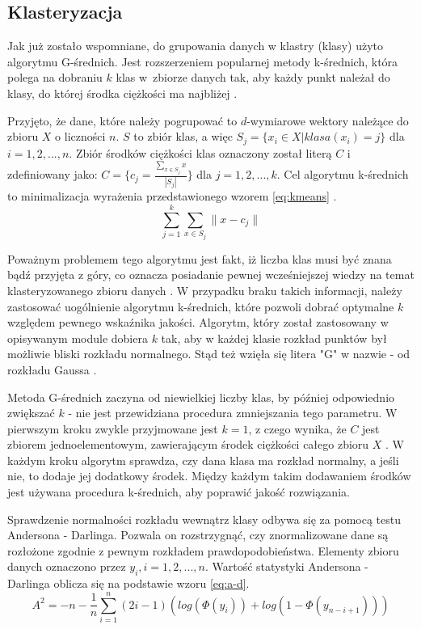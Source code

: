 \subsection{Klasteryzacja}
\quad Jak już zostało wspomniane, do grupowania danych w klastry (klasy) użyto algorytmu G-średnich. Jest rozszerzeniem popularnej metody k-średnich, która polega na dobraniu $k$ klas w~zbiorze danych tak, aby każdy punkt należał do klasy, do której środka ciężkości ma najbliżej \cite{KMeans}.

Przyjęto, że dane, które należy pogrupować to $d$-wymiarowe wektory należące do zbioru $X$ o liczności $n$. $S$ to zbiór klas, a więc $S_{j} = \{x_{i} \in X | klasa(x_{i}) = j\}$ dla $i = 1, 2, ..., n$. Zbiór środków ciężkości klas oznaczony został literą $C$ i zdefiniowany jako: $C = \{c_{j} = \frac{\sum_{x \in S_{j}} x}{|S_{j}|}\}$ dla $j = 1, 2, ..., k$.
Cel algorytmu k-średnich to minimalizacja wyrażenia przedstawionego wzorem \ref{eq:kmeans} .
\begin{equation}
\label{eq:kmeans}
\sum_{j=1}^{k}\sum_{x \in S_{j}} \|x - c_{j}\|
\end{equation}

Poważnym problemem tego algorytmu jest fakt, iż liczba klas musi być znana bądź przyjęta z góry, co oznacza posiadanie pewnej wcześniejszej wiedzy na temat klasteryzowanego zbioru danych \cite{GMeans, GMeansExplanation}. W przypadku braku takich informacji, należy zastosować uogólnienie algorytmu k-średnich, które pozwoli dobrać optymalne $k$ względem pewnego wskaźnika jakości.
Algorytm, który został zastosowany w opisywanym module dobiera $k$ tak, aby w każdej klasie rozkład punktów był możliwie bliski rozkładu normalnego. Stąd też wzięła się litera "G" w nazwie - od rozkładu Gaussa \cite{GMeans}.

Metoda G-średnich zaczyna od niewielkiej liczby klas, by później odpowiednio zwiększać $k$ - nie jest przewidziana procedura zmniejszania tego parametru. W pierwszym kroku zwykle przyjmowane jest $k = 1$, z czego wynika, że $C$ jest zbiorem jednoelementowym, zawierającym środek ciężkości całego zbioru $X$ \cite{GMeans}. W każdym kroku algorytm sprawdza, czy dana klasa ma rozkład normalny, a jeśli nie, to dodaje jej dodatkowy środek. Między każdym takim dodawaniem środków jest używana procedura k-średnich, aby poprawić jakość rozwiązania.

Sprawdzenie normalności rozkładu wewnątrz klasy odbywa się za pomocą testu Andersona - Darlinga. Pozwala on rozstrzygnąć, czy znormalizowane dane są rozłożone zgodnie z pewnym rozkładem prawdopodobieństwa. Elementy zbioru danych oznaczono przez $y_{i}, i = 1, 2, ..., n$. Wartość statystyki Andersona - Darlinga oblicza się na podstawie wzoru \ref{eq:a-d}.
\begin{equation}
\label{eq:a-d}
	A^{2} = -n - \frac{1}{n} \sum_{i=1}^{n}(2i - 1)(log(\Phi(y_{i})) + log(1 - \Phi(y_{n-i+1})))
\end{equation}

